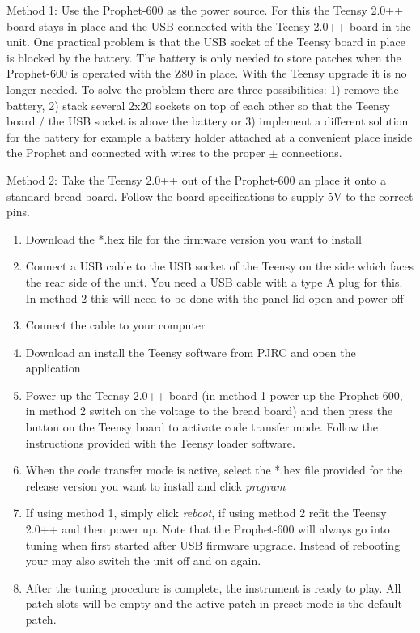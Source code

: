 Method 1: Use the Prophet-600 as the power source. For this the Teensy 2.0++ board stays in place and the USB connected with the Teensy 2.0++ board in the unit. One practical problem is that the USB socket of the Teensy board in place is blocked by the battery. The battery is only needed to store patches when the Prophet-600 is operated with the Z80 in place. With the Teensy upgrade it is no longer needed. To solve the problem there are three possibilities: 1) remove the battery, 2) stack several 2x20 sockets on top of each other so that the Teensy board / the USB socket is above the battery or 3) implement a different solution for the battery for example a battery holder attached at a convenient place inside the Prophet and connected with wires to the proper $\pm$ connections. 

Method 2: Take the Teensy 2.0++ out of the Prophet-600 an place it onto a standard bread board. Follow the board specifications to supply 5V to the correct pins.

\begin{enumerate}
  \item Download the *.hex file for the firmware version you want to install 
  \item Connect a USB cable to the USB socket of the Teensy on the side which faces the rear side of the unit. You need a USB cable with a type A plug for this. In method 2 this will need to be done with the panel lid open and power off 
  \item Connect the cable to your computer 
  \item Download an install the Teensy software from PJRC \cite{teensyloader} and open the application 
  \item Power up the Teensy 2.0++ board (in method 1 power up the Prophet-600, in method 2 switch on the voltage to the bread board) and then press the button on the Teensy board to activate code transfer mode. Follow the instructions provided with the Teensy loader software. 
  \item When the code transfer mode is active, select the *.hex file provided for the release version you want to install and click \textit{program}
  \item If using method 1, simply click \textit{reboot}, if using method 2 refit the Teensy 2.0++ and then power up. Note that the Prophet-600 will always go into tuning when first started after USB firmware upgrade. Instead of rebooting your may also switch the unit off and on again.   
  \item After the tuning procedure is complete, the instrument is ready to play. All patch slots will be empty and the active patch in preset mode is the default patch. 
\end{enumerate}
